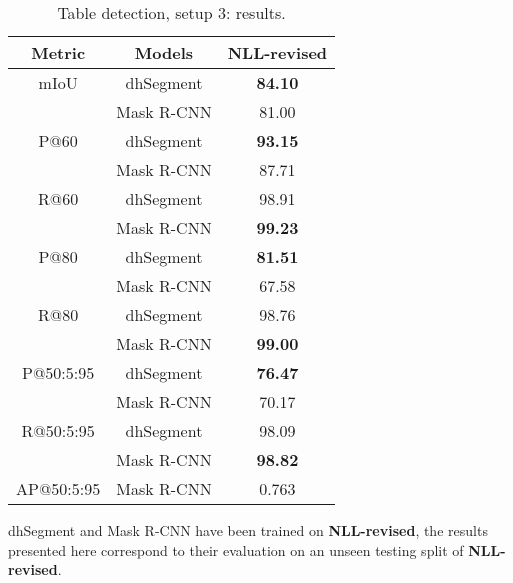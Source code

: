 \begin{table}[htp]
\begin{center}
\begin{tabular}{cc|c}
Metric & Models & NLL-revised \\
\hline
mIoU & dhSegment & \textbf{84.10} \\
 & Mask R-CNN & 81.00\\
 \hline
P@60 & dhSegment & \textbf{93.15}\\
 & Mask R-CNN & 87.71\\
  \hline
R@60 & dhSegment & 98.91\\
 & Mask R-CNN & \textbf{99.23}\\
  \hline
P@80 & dhSegment & \textbf{81.51}\\
 & Mask R-CNN & 67.58\\
 \hline
R@80 & dhSegment & 98.76\\
 & Mask R-CNN & \textbf{99.00}\\
 \hline
P@50:5:95 & dhSegment & \textbf{76.47} \\
 & Mask R-CNN & 70.17 \\
 \hline
R@50:5:95 & dhSegment & 98.09\\
 & Mask R-CNN & \textbf{98.82} \\
 \hline
 \hline
 AP@50:5:95 & Mask R-CNN & 0.763 \\
  \hline
\end{tabular}
\end{center}
\caption{Table detection, setup 3: results.}
\medskip
\small
dhSegment and Mask R-CNN have been trained on \textbf{NLL-revised}, the results presented here correspond to their evaluation on an unseen testing split of \textbf{NLL-revised}.
\label{setup3_results}
\end{table}%

